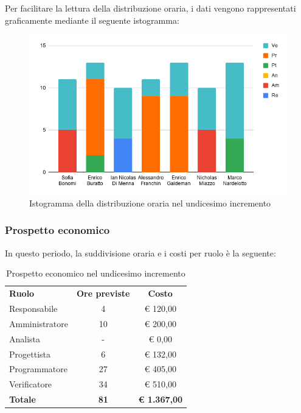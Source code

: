 \documentclass[../piano-di-progetto.tex]{subfiles}
\begin{document}
  Per facilitare la lettura della distribuzione oraria, i dati vengono rappresentati graficamente mediante il seguente istogramma:
  \begin{figure}[H]
    \centering
    \includegraphics[width=12cm]{img/ore-11-incr.png}
    \caption{Istogramma della distribuzione oraria nel undicesimo incremento}
    \label{fig:ore-componente-progettazione}
  \end{figure}

  \subsubsection{Prospetto economico}
  In questo periodo, la suddivisione oraria e i costi per ruolo è la seguente:

  \begin{table}[H]
    \centering
    \begin{tabular}{lcc}
      \rowcolor{lightgray}
      \textbf{Ruolo}  & \textbf{Ore previste} & \textbf{Costo}      \\
Responsabile    & 4           & € 120,00            \\
Amministratore  & 10          & € 200,00            \\
Analista        & -           & € 0,00              \\
Progettista     & 6           & € 132,00            \\
Programmatore   & 27          & € 405,00            \\
Verificatore    & 34          & € 510,00            \\
\textbf{Totale} & \textbf{81} & \textbf{€ 1.367,00}
    \end{tabular}
    \caption{Prospetto economico nel undicesimo incremento}
  \end{table}
\end{document}
